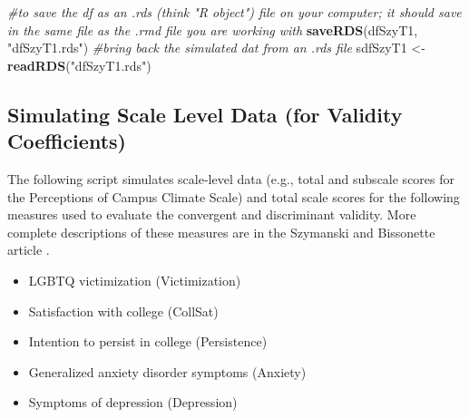 \documentclass[
  english,
]{book}
\newenvironment{Shaded}{\begin{snugshade}}{\end{snugshade}}
\newcommand{\CommentTok}[1]{\textcolor[rgb]{0.56,0.35,0.01}{\textit{#1}}}
\newcommand{\KeywordTok}[1]{\textcolor[rgb]{0.13,0.29,0.53}{\textbf{#1}}}
\newcommand{\NormalTok}[1]{#1}
\newcommand{\StringTok}[1]{\textcolor[rgb]{0.31,0.60,0.02}{#1}}
\providecommand{\tightlist}{%
  \setlength{\itemsep}{0pt}\setlength{\parskip}{0pt}}
\begin{document}
\begin{Shaded}
\begin{Highlighting}[]
\CommentTok{#to save the df as an .rds (think "R object") file on your computer; it should save in the same file as the .rmd file you are working with}
\KeywordTok{saveRDS}\NormalTok{(dfSzyT1, }\StringTok{"dfSzyT1.rds"}\NormalTok{)}
\CommentTok{#bring back the simulated dat from an .rds file}
\NormalTok{sdfSzyT1 <-}\StringTok{ }\KeywordTok{readRDS}\NormalTok{(}\StringTok{"dfSzyT1.rds"}\NormalTok{)}
\end{Highlighting}
\end{Shaded}

\hypertarget{simulating-scale-level-data-for-validity-coefficients}{%
\subsection{Simulating Scale Level Data (for Validity Coefficients)}\label{simulating-scale-level-data-for-validity-coefficients}}

The following script simulates scale-level data (e.g., total and subscale scores for the Perceptions of Campus Climate Scale) and total scale scores for the following measures used to evaluate the convergent and discriminant validity. More complete descriptions of these measures are in the Szymanski and Bissonette article \citeyearpar{szymanski_perceptions_2020}.

\begin{itemize}
\tightlist
\item
  LGBTQ victimization (Victimization)
\item
  Satisfaction with college (CollSat)
\item
  Intention to persist in college (Persistence)
\item
  Generalized anxiety disorder symptoms (Anxiety)
\item
  Symptoms of depression (Depression)
\end{itemize}
\end{document}
